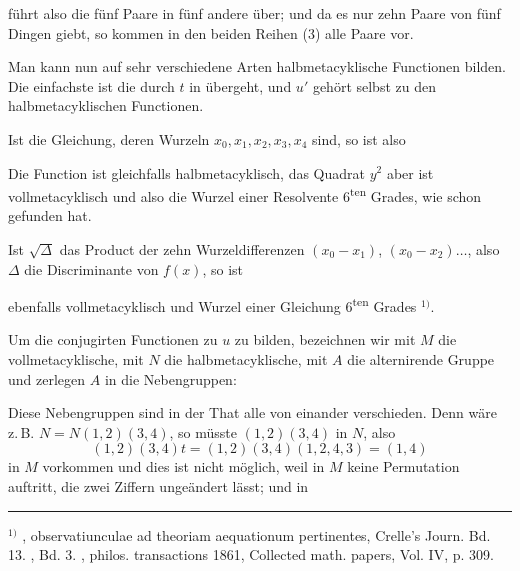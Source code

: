 führt also die fünf Paare in fünf andere über; und da es nur
zehn Paare von fünf Dingen giebt, so kommen in den beiden
Reihen (3) alle Paare vor.

Man kann nun auf sehr verschiedene Arten halbmetacyklische
Functionen bilden. Die einfachste ist
die durch $t$ in
übergeht, und $u'$ gehört selbst zu den halbmetacyklischen Functionen.

Ist
die Gleichung, deren Wurzeln $x_0, x_1, x_2, x_3, x_4$ sind, so ist also

Die Function
ist gleichfalls halbmetacyklisch, das Quadrat $y^2$ aber ist vollmetacyklisch
 und also die Wurzel einer Resolvente 6\textsuperscript{ten} Grades,
wie schon  gefunden hat.

Ist $\sqrt{\Delta}$ das Product der zehn Wurzeldifferenzen $(x_0 - x_1)$,
$(x_0 - x_2) \dots$, also $\Delta$ die Discriminante von $f(x)$, so ist

ebenfalls vollmetacyklisch und Wurzel einer Gleichung 6\textsuperscript{ten} Grades $^{1)}$.

Um die conjugirten Functionen zu $u$ zu bilden, bezeichnen
wir mit $M$ die vollmetacyklische, mit $N$ die halbmetacyklische,
mit $A$ die alternirende Gruppe und zerlegen $A$ in die Nebengruppen:

Diese Nebengruppen sind in der That alle von einander
verschieden. Denn wäre z.\,B. $N = N(1,2)(3,4)$, so müsste
$(1,2)(3,4)$ in $N$, also
\[ (1,2)(3,4)t = (1,2)(3,4)(1,2,4,3) = (1,4) \]
in $M$ vorkommen und dies ist nicht möglich, weil in $M$ keine
Permutation auftritt, die zwei Ziffern ungeändert lässt; und in

\par\noindent\rule{4cm}{0.4pt}\par
\noindent $^{1)}$ , \glqq{}observatiunculae ad theoriam aequationum pertinentes\grqq{},
Crelle's Journ. Bd. 13. , Bd. 3. , philos. transactions
 1861, Collected math. papers, Vol. IV, p. 309.
